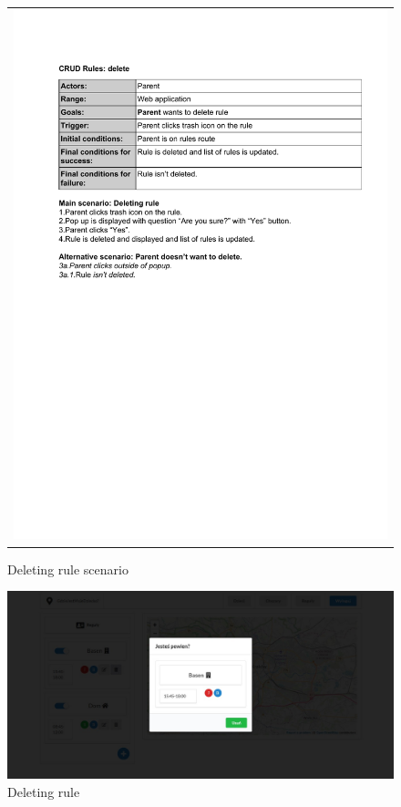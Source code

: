 \documentclass{sprawozdanie-agh}
\begin{document}
		\begin{figure}[H] 
			\centering
			\begin{tabular}{c}
				\includegraphics[width=.80\textwidth]{deR_cropped} 
			\end{tabular}  
		\caption{Deleting rule scenario}
		\end{figure}

		\begin{figure}[H]
			\centering
			\includegraphics[width=.80\textwidth]{deleteRule}
			\caption{Deleting rule}
		\end{figure}
\end{document}
